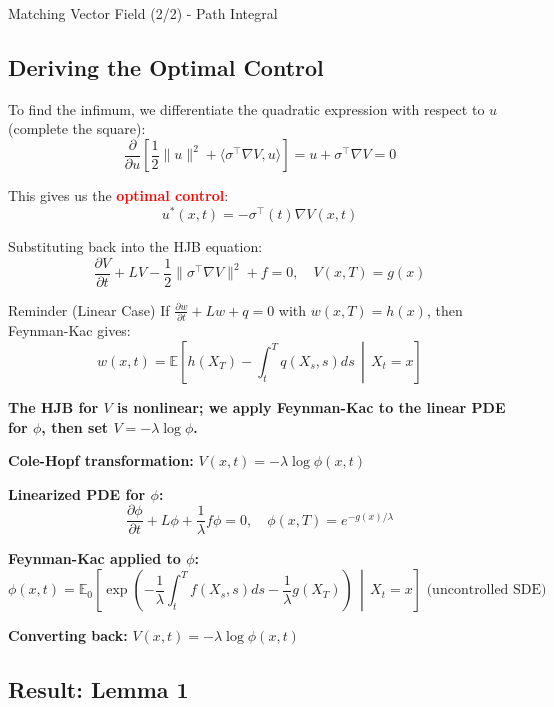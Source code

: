 \documentclass[aspectratio=169,xcolor=dvipsnames]{beamer}
\begin{document}
\begin{frame}[allowframebreaks]{Matching Vector Field (2/2) - Path Integral}
    \vspace{0.5cm}
    
    \subsection*{Deriving the Optimal Control}
    
    To find the infimum, we differentiate the quadratic expression with respect to $u$ (complete the square):
    $$\frac{\partial}{\partial u}\left[\frac{1}{2}\|u\|^2 + \langle\sigma^\top \nabla V, u\rangle\right] = u + \sigma^\top \nabla V = 0$$
    
    This gives us the \textcolor{red}{\textbf{optimal control}}:
    $$u^*(x,t) = -\sigma^\top(t)\nabla V(x,t)$$
    
    Substituting back into the HJB equation:
    $$\frac{\partial V}{\partial t} + LV - \frac{1}{2}\|\sigma^\top \nabla V\|^2 + f = 0, \quad V(x,T) = g(x)$$
    
    \vspace{0.8cm}
    
    \begin{alertblock}{Reminder (Linear Case)}
        If $\frac{\partial w}{\partial t} + Lw + q = 0$ with $w(x,T) = h(x)$, then Feynman-Kac gives:
        $$w(x,t) = \mathbb{E}\left[h(X_T) - \int_t^T q(X_s,s) ds \,\middle|\, X_t = x\right]$$
        
        \textbf{The HJB for $V$ is nonlinear; we apply Feynman-Kac to the linear PDE for $\phi$, then set $V = -\lambda \log \phi$.}
    \end{alertblock}

    \textbf{Cole-Hopf transformation:} $V(x,t) = -\lambda \log \phi(x,t)$

    \textbf{Linearized PDE for $\phi$:} 
    $$\frac{\partial \phi}{\partial t} + L\phi + \frac{1}{\lambda}f\phi = 0, \quad \phi(x,T) = e^{-g(x)/\lambda}$$

    \textbf{Feynman-Kac applied to $\phi$:}
    $$\phi(x,t) = \mathbb{E}_0\left[\exp\left(-\frac{1}{\lambda}\int_t^T f(X_s,s) ds - \frac{1}{\lambda} g(X_T)\right) \,\middle|\, X_t = x\right] \text{ (uncontrolled SDE)}$$

    \textbf{Converting back:} $V(x,t) = -\lambda \log \phi(x,t)$
    
    \vspace{0.8cm}
    
    \subsection*{Result: Lemma 1}
    

\end{frame}
\end{document}

